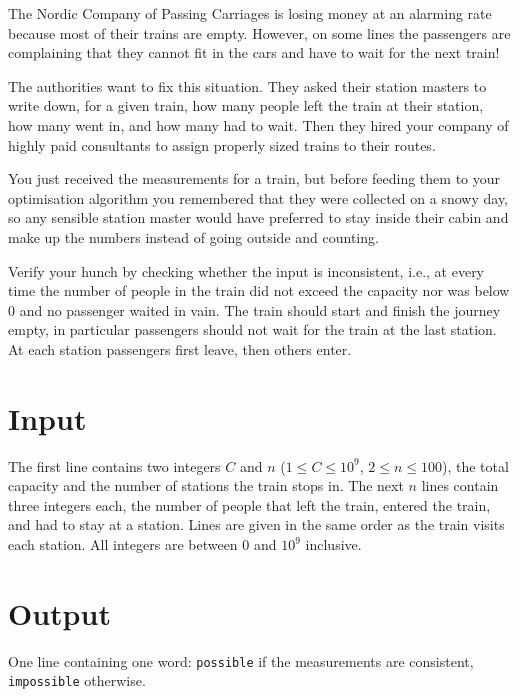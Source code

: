 

The Nordic Company of Passing Carriages is losing money at an alarming
rate because most of their trains are empty. However, on some lines
the passengers are complaining that they cannot fit in the cars and
have to wait for the next train!

The authorities want to fix this situation. They asked their station
masters to write down, for a given train, how many people left the
train at their station, how many went in, and how many had to
wait. Then they hired your company of highly paid consultants to
assign properly sized trains to their routes.

You just received the measurements for a train, but before feeding
them to your optimisation algorithm you remembered that they were
collected on a snowy day, so any sensible station master would have
preferred to stay inside their cabin and make up the numbers instead
of going outside and counting.

Verify your hunch by checking whether the input is inconsistent, i.e.,
at every time the number of people in the train did not exceed the
capacity nor was below 0 and no passenger waited in vain. The train
should start and finish the journey empty, in particular passengers
should not wait for the train at the last station. At each station passengers first leave, then
others enter.

\section*{Input}

The first line contains two integers $C$ and $n$ ($1 \leq C \leq 10^9$, $2 \leq n \leq
100$), the total capacity and the number of stations the train stops
in. The next $n$ lines contain three integers each, the number of
people that left the train, entered the train, and had to stay at a
station. Lines are given in the same order as the train visits each
station. All integers are between $0$ and $10^9$ inclusive.

\section*{Output}

One line containing one word: \verb+possible+ if the measurements are
consistent, \verb+impossible+ otherwise.
